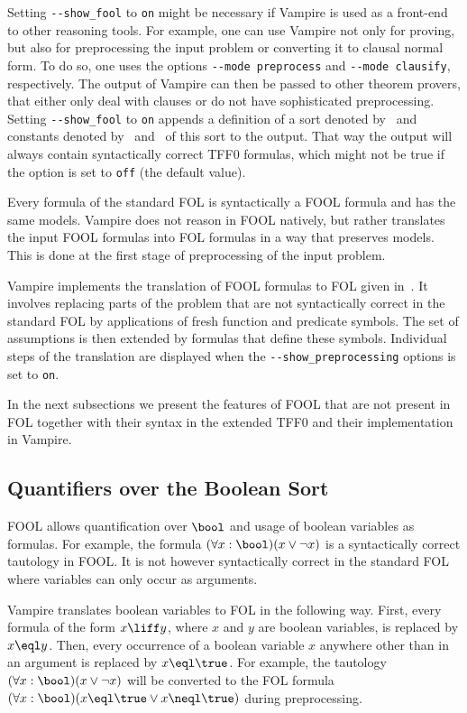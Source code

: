 Setting \verb'--show_fool' to \verb'on' might be necessary if Vampire is used as a front-end to other reasoning tools. For example, one can use Vampire not only for proving, but also for preprocessing the input problem or converting it to clausal normal form. To do so, one uses the options \verb|--mode preprocess| and \verb|--mode clausify|, respectively. The output of Vampire can then be passed to other theorem provers, that either only deal with clauses or do not have sophisticated preprocessing. Setting \verb'--show_fool' to \verb'on' appends a definition of a sort denoted by \dbool\ and constants denoted by \ddtrue\ and \ddfalse\ of this sort to the output. That way the output will always contain syntactically correct TFF0 formulas, which might not be true if the option is set to \verb'off' (the default value).

Every formula of the standard FOL is syntactically a FOOL formula and has the same models. Vampire does not reason in FOOL natively, but rather translates the input FOOL formulas into FOL formulas in a way that preserves models. This is done at the first stage of preprocessing of the input problem.

Vampire implements the translation of FOOL formulas to FOL given in~\cite{FOOL}. It involves replacing parts of the problem that are not syntactically correct in the standard FOL by applications of fresh function and predicate symbols. The set of assumptions is then extended by formulas that define these symbols. Individual steps of the translation are displayed when the \verb'--show_preprocessing' options is set to \verb'on'.

In the next subsections we present the features of FOOL that are not present in FOL together with their syntax in the extended TFF0 and their implementation in Vampire.

\subsection{Quantifiers over the Boolean Sort}

FOOL allows quantification over $\bool$ and usage of boolean variables as formulas. For example, the formula $(\forall x:\bool)(x \lor \neg x)$ is a syntactically correct tautology in FOOL. It is not however syntactically correct in the standard FOL where variables can only occur as arguments.

Vampire translates boolean variables to FOL in the following way. First, every formula of the form $x \liff y$, where $x$ and $y$ are boolean variables, is replaced by $x \eql y$. Then, every occurrence of a boolean variable $x$ anywhere other than in an argument is replaced by $x \eql \true$. For example, the tautology $(\forall x:\bool)(x \lor \neg x)$ will be converted to the FOL formula $(\forall x:\bool)(x \eql \true \lor x \neql \true)$ during preprocessing.

